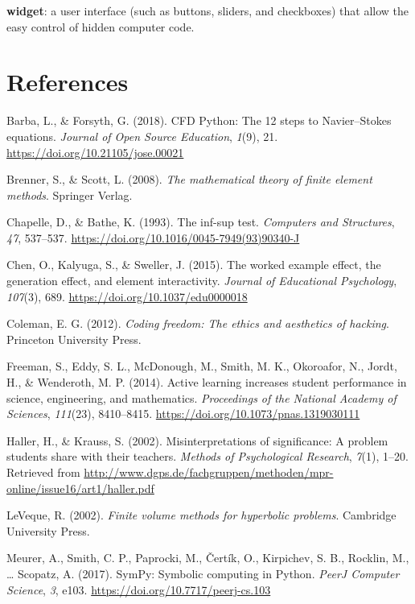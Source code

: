 \documentclass[]{book}
\begin{document}
\textbf{widget}: a user interface (such as buttons, sliders, and
checkboxes) that allow the easy control of hidden computer code.

\chapter*{References}\label{references}

\hypertarget{refs}{}
\hypertarget{ref-barbacfd}{}
Barba, L., \& Forsyth, G. (2018). CFD Python: The 12 steps to
Navier--Stokes equations. \emph{Journal of Open Source Education},
\emph{1}(9), 21. \url{https://doi.org/10.21105/jose.00021}

\hypertarget{ref-brenner2008mathematical}{}
Brenner, S., \& Scott, L. (2008). \emph{The mathematical theory of
finite element methods}. Springer Verlag.

\hypertarget{ref-chapelle1993inf}{}
Chapelle, D., \& Bathe, K. (1993). The inf-sup test. \emph{Computers and
Structures}, \emph{47}, 537--537.
\url{https://doi.org/10.1016/0045-7949(93)90340-J}

\hypertarget{ref-chen2015worked}{}
Chen, O., Kalyuga, S., \& Sweller, J. (2015). The worked example effect,
the generation effect, and element interactivity. \emph{Journal of
Educational Psychology}, \emph{107}(3), 689.
\url{https://doi.org/10.1037/edu0000018}

\hypertarget{ref-coleman2012coding}{}
Coleman, E. G. (2012). \emph{Coding freedom: The ethics and aesthetics
of hacking}. Princeton University Press.

\hypertarget{ref-freeman2014active}{}
Freeman, S., Eddy, S. L., McDonough, M., Smith, M. K., Okoroafor, N.,
Jordt, H., \& Wenderoth, M. P. (2014). Active learning increases student
performance in science, engineering, and mathematics. \emph{Proceedings
of the National Academy of Sciences}, \emph{111}(23), 8410--8415.
\url{https://doi.org/10.1073/pnas.1319030111}

\hypertarget{ref-HallerKrauss2002}{}
Haller, H., \& Krauss, S. (2002). Misinterpretations of significance: A
problem students share with their teachers. \emph{Methods of
Psychological Research}, \emph{7}(1), 1--20. Retrieved from
\url{http://www.dgps.de/fachgruppen/methoden/mpr-online/issue16/art1/haller.pdf}

\hypertarget{ref-leveque2002finite}{}
LeVeque, R. (2002). \emph{Finite volume methods for hyperbolic
problems}. Cambridge University Press.

\hypertarget{ref-Meurer2017}{}
Meurer, A., Smith, C. P., Paprocki, M., Čertík, O., Kirpichev, S. B.,
Rocklin, M., \ldots{} Scopatz, A. (2017). SymPy: Symbolic computing in
Python. \emph{PeerJ Computer Science}, \emph{3}, e103.
\url{https://doi.org/10.7717/peerj-cs.103}
\end{document}
